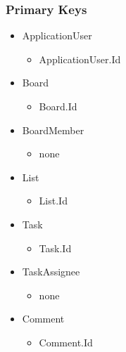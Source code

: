 \documentclass[letterpaper]{article}
\begin{document}
\subsubsection{Primary Keys}
\begin{itemize}
  \item ApplicationUser
    \begin{itemize}
      \item ApplicationUser.Id
    \end{itemize}
  \item Board
    \begin{itemize}
      \item Board.Id
    \end{itemize}
  \item BoardMember
    \begin{itemize}
      \item none
    \end{itemize}
  \item List
    \begin{itemize}
      \item List.Id
    \end{itemize}
  \item Task
    \begin{itemize}
      \item Task.Id
    \end{itemize}
  \item TaskAssignee
    \begin{itemize}
      \item none
    \end{itemize}
  \item Comment
    \begin{itemize}
      \item Comment.Id
    \end{itemize}
\end{itemize}
\end{document}
